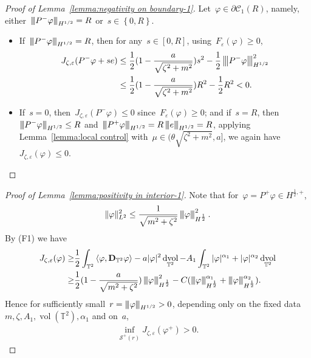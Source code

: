\documentclass[11pt,final]{amsart}
\newcommand{\tnorm}[1]{%
  \left\vert\kern-0.3ex\left\vert\kern-0.3ex\left\vert #1 \right\vert\kern-0.3ex\right\vert\kern-0.3ex\right\vert
}
\newcommand{\p}{\partial}
\newcommand{\T}{\mathbb{T}}
\newcommand{\dd}{\mathop{}\!\mathrm{d}}
\newcommand{\eps}{\varepsilon}
\newcommand{\pD}{\mathbf{D}}
\newcommand{\Abracket}[1]{\left<#1\right>} %
\newcommand{\braces}[1]{\left\{#1\right\}} %
\DeclareMathOperator{\dv}{\dd{vol}}
\DeclareMathOperator{\vol}{vol}
\begin{document}
\begin{proof}[Proof of Lemma~\ref{lemma:negativity on boundary-1}]
    Let~$\varphi\in\p\mathscr{C}_1(R)$, namely, either~$\tnorm{P^-\varphi}_{H^{1/2}}=R$ or~$s\in \braces{0,R}$.
    \begin{itemize}
        \item If~$\tnorm{P^-\varphi}_{H^{1/2}}=R$, then for any~$s\in[0,R]$, using~$F_\eps(\varphi)\geq 0$,
            \begin{align}
                J_{\zeta,\eps}(P^-\varphi+s e)&\leq \frac{1}{2}(1-\frac{a}{\sqrt{\zeta^2+m^2}})s^2 -  \frac{1}{2}\tnorm{P^-\varphi}^2_{H^{1/2}} \\
                &\leq \frac{1}{2}(1-\frac{a}{\sqrt{\zeta^2+m^2}})R^2 -\frac{1}{2}R^2< 0.
            \end{align}
        \item If~$s=0$, then~$J_{\zeta,\eps}(P^-\varphi)\leq 0$ since~$F_\eps(\varphi)\geq 0$; and if~$s=R$, then~$\tnorm{P^-\varphi}_{H^{1/2}}\leq R$ and~$\tnorm{P^+\varphi}_{H^{1/2}}= R\tnorm{e}_{H^{1/2}}=R$, applying Lemma~\ref{lemma:local control} with~$\mu \in (\theta\sqrt{\zeta^2+m^2}, a]$, we again have~$J_{\zeta,\eps}(\varphi)\leq 0$.
    \end{itemize}
\end{proof}

\begin{proof}[Proof of Lemma~\ref{lemma:positivity in interior-1}]
Note that for~$\varphi=P^+\varphi\in H^{\frac{1}{2},+}$,
\begin{align}
    \|\varphi\|^2_{L^2}\leq \frac{1}{\sqrt{m^2+\zeta^2}}\tnorm{\varphi}^2_{H^{\frac{1}{2}}}.
\end{align}
By (F1) we have 
\begin{align}
    J_{\zeta,\eps}(\varphi)
    \geq &  \frac{1}{2}\int_{\mathbb{T}^2} \Abracket{\varphi, \pD_{\T^2}\varphi} - a|\varphi|^2 \dv_{\T^2}
        - A_1\int_{\mathbb{T}^2} |\varphi|^{\alpha_1} + |\varphi|^{\alpha_2}\dv_{\T^2}\\
    \geq& \frac{1}{2}(1-\frac{a}{\sqrt{m^2+\zeta^2}})\tnorm{\varphi}^2_{H^{\frac{1}{2}}}
    -C(\tnorm{\varphi}^{\alpha_1}_{H^{\frac{1}{2}}}+\tnorm{\varphi}^{\alpha_2}_{H^{\frac{1}{2}}}).
\end{align}
Hence for sufficiently small~$r=\tnorm{\varphi}_{H^{1/2}}>0$, depending only on the fixed data~$m,\zeta,A_1, \vol(\T^2),\alpha_1$ and on~$a$,
\begin{align}
    \inf_{\mathscr{S}^+(r)} J_{\zeta,\eps}(\varphi^+)>0.
\end{align}
\end{proof}
\end{document}
